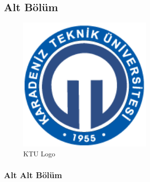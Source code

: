 \subsection{Alt Bölüm}
\begin{figure}[!ht]
  \centering
  \includegraphics[width=0.6\textwidth]{Figures/ktuLogo}
  \caption{KTU Logo }
  \label{fig:wordvslatex}
\end{figure}

\subsubsection{Alt Alt Bölüm}